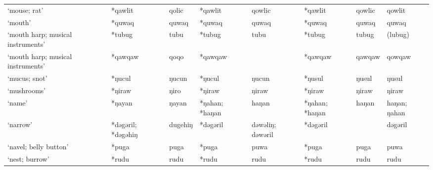 \begin{landscape}
\begin{longtable}[c]{@{}p{3cm}<{\raggedright}p{2.75cm}<{\raggedright}p{2.75cm}<{\raggedright}p{2.75cm}<{\raggedright}p{2.75cm}<{\raggedright}p{2.75cm}<{\raggedright}p{2.75cm}<{\raggedright}p{2.75cm}<{\raggedright}@{}}
`mouse; rat'                                         & *qawlit            & qolic                          & *qawlit            & qowlic                     & *qawlit          & qowlic                   & qowlit                            \\
`mouth'                                              & *quwaq             & quwaq                          & *quwaq             & quwaq                      & *quwaq           & quwaq                    & quwaq                             \\
`mouth harp; musical instruments'                    & *tubug             & tubu                           & *tubug             & tubu                       & *tubug           & tubug                    & (lubug)                           \\
`mouth harp; musical instruments'                    & *qawqaw            & qoqo                           & *qawqaw            &                            & *qawqaw          & qawqaw                   & qowqaw                            \\
`mucus; snot'                                        & *ŋucul             & ŋucun                          & *ŋucul             & ŋucun                      & *ŋusul           & ŋusul                    & ŋusul                             \\
`mushrooms'                                          & *ŋiraw             & ŋiro                           & *ŋiraw             & ŋiraw                      & *ŋiraw           & ŋiraw                    & ŋiraw                             \\
`name'                                               & *ŋayan             & ŋayan                          & *ŋahan; *haŋan     & haŋan                      & *ŋahan; *haŋan   & haŋan                    & haŋan; ŋahan                      \\
`narrow'                                             & *dəgəril; *dəgəhiŋ & dugehiŋ                        & *dəgəril           & dəwəliŋ; dəwəril           & *dəgəril         &                          & dəgəril                           \\
`navel; belly button'                                & *puga              & puga                           & *puga              & puwa                       & *puga            & puga                     & puwa                              \\
`nest; burrow'                                       & *rudu              & rudu                           & *rudu              & rudu                       & *rudu            & rudu                     & rudu                              \\

\end{longtable}
\end{landscape}
